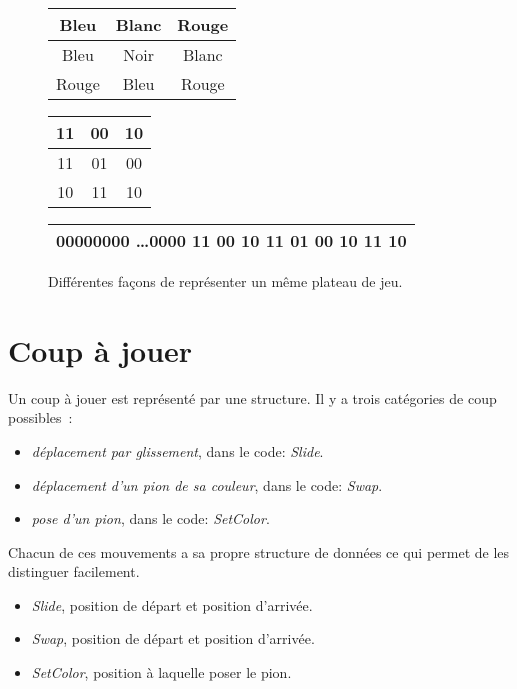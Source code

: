 \begin{figure}[H]
    \centering
    \begin{tabular}{|c|c|c|}
        \hline
        Bleu  & Blanc & Rouge \\
        \hline
        Bleu  & Noir  & Blanc \\
        \hline
        Rouge & Bleu  & Rouge \\
        \hline
    \end{tabular}
    \enskip
    \begin{tabular}{|c|c|c|}
        \hline
        11 & 00 & 10 \\
        \hline
        11 & 01 & 00 \\
        \hline
        10 & 11 & 10 \\
        \hline
    \end{tabular}
    \enskip
    \begin{tabular}{|c|}
        \hline
        00000000 \ldots 0000 11 00 10 11 01 00 10 11 10 \\
        \hline
    \end{tabular}
    \newline
    \caption{Différentes façons de représenter un même plateau de jeu.}
\end{figure}

\section{Coup à jouer}

Un coup à jouer est représenté par une structure.
Il y a trois catégories de coup possibles :
\begin{itemize}
    \item \emph{déplacement par glissement}, dans le code: \emph{Slide}.
    \item \emph{déplacement d'un pion de sa couleur}, dans le code: \emph{Swap}.
    \item \emph{pose d'un pion}, dans le code: \emph{SetColor}.
\end{itemize}

Chacun de ces mouvements a sa propre structure de données ce qui permet de les distinguer facilement.
\begin{itemize}
    \item \emph{Slide}, position de départ et position d'arrivée.
    \item \emph{Swap}, position de départ et position d'arrivée.
    \item \emph{SetColor}, position à laquelle poser le pion.
\end{itemize}

